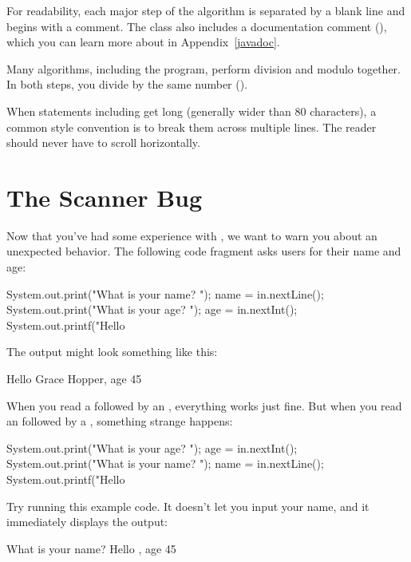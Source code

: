 
For readability, each major step of the algorithm is separated by a blank line and begins with a comment.
The class also includes a documentation comment (\java{/**}), which you can learn more about in Appendix~\ref{javadoc}.

Many algorithms, including the  program, perform division and modulo together.
In both steps, you divide by the same number ().

When statements including  get long (generally wider than 80 characters), a common style convention is to break them across multiple lines.
The reader should never have to scroll horizontally.


\section{The Scanner Bug}

Now that you've had some experience with , we want to warn you about an unexpected behavior.
The following code fragment asks users for their name and age:

\begin{code}
System.out.print("What is your name? ");
name = in.nextLine();
System.out.print("What is your age? ");
age = in.nextInt();
System.out.printf("Hello %
\end{code}

The output might look something like this:

\begin{stdout}
Hello Grace Hopper, age 45
\end{stdout}

When you read a  followed by an , everything works just fine.
But when you read an  followed by a , something strange happens:

\begin{code}
System.out.print("What is your age? ");
age = in.nextInt();
System.out.print("What is your name? ");
name = in.nextLine();
System.out.printf("Hello %
\end{code}

Try running this example code.
It doesn't let you input your name, and it immediately displays the output:

\begin{stdout}
What is your name? Hello , age 45
\end{stdout}


